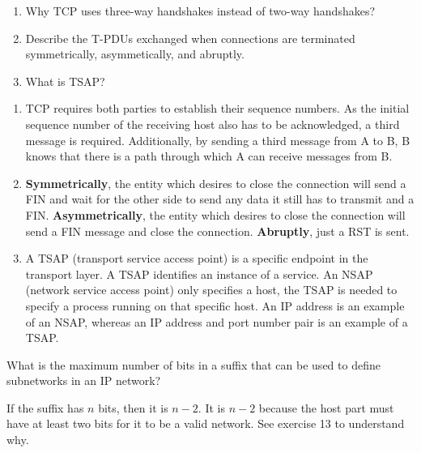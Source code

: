\begin{Exercise}
\begin{enumerate}
\item Why TCP uses three-way handshakes instead of two-way handshakes?
\item Describe the T-PDUs exchanged when connections are terminated symmetrically, asymmetically, and abruptly.
\item What is TSAP?
\end{enumerate}
\end{Exercise}
\begin{Answer}
\begin{enumerate}
\item TCP requires both parties to establish their sequence numbers. As the initial sequence number of the receiving host also has to be acknowledged, a third message is required.
Additionally, by sending a third message from A to B, B knows that there is a path through which A can receive messages from B.
\item \textbf{Symmetrically}, the entity which desires to close the connection will send a FIN and wait for the other side to send any data it still has to transmit and a FIN. \textbf{Asymmetrically}, the entity which desires to close the connection will send a FIN message and close the connection. \textbf{Abruptly}, just a RST is sent.
\item A TSAP (transport service access point) is a specific endpoint in the transport layer. A TSAP identifies an instance of a service.
An NSAP (network service access point) only specifies a host, the TSAP is needed to specify a process running on that specific host.
An IP address is an example of an NSAP, whereas an IP address and port number pair is an example of a TSAP.
\end{enumerate}
\end{Answer}

\begin{Exercise}
What is the maximum number of bits in a suffix that can be used to define subnetworks in an IP network?
\end{Exercise}
\begin{Answer}
If the suffix has \(n\) bits, then it is \(n - 2\).
It is \(n - 2\) because the host part must have at least two bits for it to be a valid network.
See exercise 13 to understand why.
\end{Answer}

